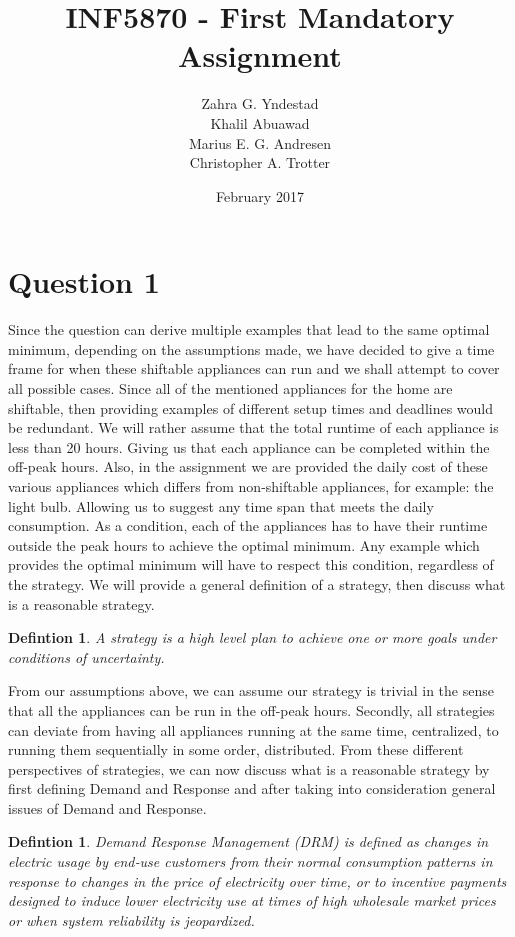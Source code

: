 \documentclass{article}
\title{INF5870 - First Mandatory Assignment}
\author{Zahra G. Yndestad \\ Khalil Abuawad \\ Marius E. G. Andresen \\ Christopher A. Trotter}
\date{February 2017}
\newtheorem{definition}[theorem]{Defintion}
\begin{document}
\maketitle

\section{Question 1}
	Since the question can derive multiple examples that lead to the same optimal minimum, depending on the assumptions made, we have decided to give a time frame for when these shiftable appliances can run and we shall attempt to cover all possible cases. Since all of the mentioned appliances for the home are shiftable, then providing examples of different setup times and deadlines would be redundant. We will rather assume that the total runtime of each appliance is less than 20 hours. Giving us that each appliance can be completed within the off-peak hours. Also, in the assignment we are provided the daily cost of these various appliances which differs from non-shiftable appliances, for example: the light bulb. Allowing us to suggest any time span that meets the daily consumption.  As a condition, each of the appliances has to have their runtime outside the peak hours to achieve the optimal minimum. Any example which provides the optimal minimum will have to respect this condition, regardless of the strategy. We will provide a general definition of a strategy, then discuss what is a reasonable strategy.
	
	\begin{definition}
    	A strategy is a high level plan to achieve one or more goals under conditions of uncertainty{\cite{wikistrategy}}. 
	\end{definition}
	
	From our assumptions above, we can assume our strategy is trivial in the sense that all the appliances can be run in the off-peak hours. Secondly, all strategies can deviate from having all appliances running at the same time, centralized, to running them sequentially in some order, distributed. From these different perspectives of strategies, we can now discuss what is a reasonable strategy by first defining Demand and Response and after taking into consideration general issues of Demand and Response.
	
	\begin{definition}
	    Demand Response Management (DRM) is defined as changes in electric usage by end‐use customers from their normal consumption patterns in response to changes in the price of electricity over time, or to incentive payments designed to induce lower electricity use at times of high wholesale market prices or when system reliability is jeopardized\cite{defDRM}.
	\end{definition}
	
\end{document}
